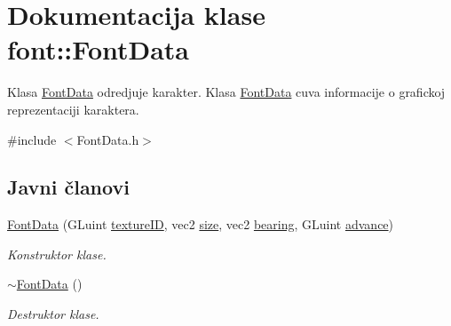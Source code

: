 \hypertarget{classfont_1_1FontData}{}\section{Dokumentacija klase font\+:\+:Font\+Data}
\label{classfont_1_1FontData}


Klasa \hyperlink{classfont_1_1FontData}{Font\+Data} odredjuje karakter. Klasa \hyperlink{classfont_1_1FontData}{Font\+Data} cuva informacije o grafickoj reprezentaciji karaktera.  




{\ttfamily \#include $<$Font\+Data.\+h$>$}

\subsection*{Javni članovi}
\begin{DoxyCompactItemize}
\item 
\hyperlink{classfont_1_1FontData_a6c2af608dc84f16f1fc29fb30a340f51}{Font\+Data} (G\+Luint \hyperlink{classfont_1_1FontData_ad91fcb854ec0a18c84d315c5c70f0eb5}{texture\+ID}, vec2 \hyperlink{classfont_1_1FontData_a783ccdb54f0b3319c31c31bd8acf6111}{size}, vec2 \hyperlink{classfont_1_1FontData_a08a463faed8b16ed9fd55f94228a44d4}{bearing}, G\+Luint \hyperlink{classfont_1_1FontData_a837cf15ff5ef8e10d0aa6132bff4b676}{advance})
\begin{DoxyCompactList}\small\item\em Konstruktor klase. \end{DoxyCompactList}\item 
\hyperlink{classfont_1_1FontData_ab3a963659d66718675a09543f40e729e}{$\sim$\+Font\+Data} ()
\begin{DoxyCompactList}\small\item\em Destruktor klase. \end{DoxyCompactList}\end{DoxyCompactItemize}
